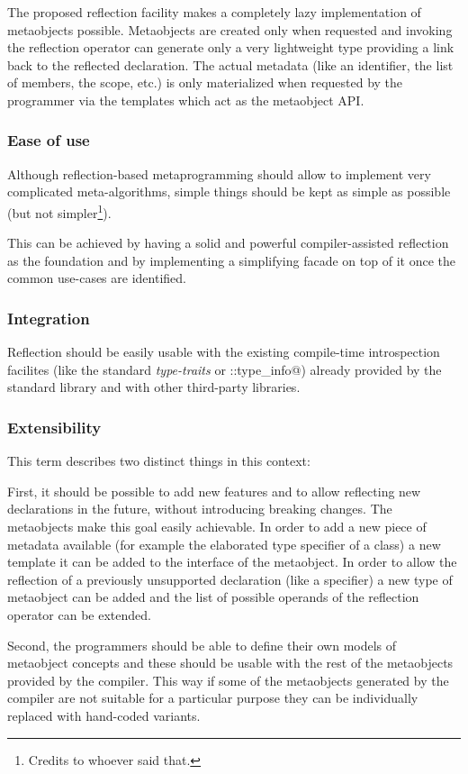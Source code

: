 The proposed reflection facility makes a completely lazy implementation of
metaobjects possible. Metaobjects are created only when requested and invoking
the reflection operator can generate only a very
lightweight type providing a link back to the reflected declaration. The actual
metadata (like an identifier, the list of members, the scope, etc.)
 is only materialized when requested by the programmer via the
templates which act as the metaobject API.

\subsubsection{Ease of use}
\label{design-ease-of-use}

Although reflection-based metaprogramming should allow to implement very
complicated meta-algorithms, simple things should be kept as simple as possible
(but not simpler\footnote{Credits to whoever said that.}).

This can be achieved by having a solid and powerful compiler-assisted reflection
as the foundation and by implementing a simplifying facade on top of it once
the common use-cases are identified.

\subsubsection{Integration}
\label{design-integration}

Reflection should be easily
usable with the existing compile-time introspection facilites (like the standard
{\em type-traits} or \verb@std::type_info@)
already provided by the standard library and with other third-party libraries.

\subsubsection{Extensibility}
\label{design-extensibility}

This term describes two distinct things in this context:

First, it should be possible to add new features and to allow reflecting new declarations
in the future, without introducing breaking changes. The metaobjects make this
goal easily achievable. In order to add a new piece of metadata available
(for example the elaborated type specifier of a class) a new template 
it can be added to the interface of the metaobject. In order to allow the reflection
of a previously unsupported declaration (like a specifier) a new type of metaobject
can be added and the list of possible operands of the reflection operator
can be extended.

Second, the programmers should be able to define their own models of metaobject concepts
and these should be usable with the rest of the metaobjects provided by the
compiler. This way if some of the metaobjects generated by the compiler are not
suitable for a particular purpose they can be individually replaced with
hand-coded variants.


